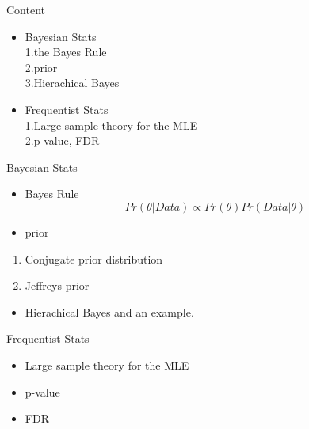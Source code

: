 \documentclass[ignorenonframetext,]{beamer}
\begin{document}
\begin{frame}{Content}

\begin{itemize}
\itemsep1pt\parskip0pt
\item
  Bayesian Stats\\ 1.the Bayes Rule\\ 2.prior\\ 3.Hierachical Bayes\\
\item
  Frequentist Stats\\ 1.Large sample theory for the MLE\\ 2.p-value, FDR
\end{itemize}

\end{frame}

\begin{frame}{Bayesian Stats}

\begin{itemize}
\itemsep1pt\parskip0pt
\item
  Bayes Rule \[Pr(\theta|Data) \varpropto Pr(\theta)Pr(Data|\theta)\]
\item
  prior\\
\end{itemize}

\begin{enumerate}
\def\labelenumi{\arabic{enumi}.}
\itemsep1pt\parskip0pt
\item
  Conjugate prior distribution\\
\item
  Jeffreys prior\\
\end{enumerate}

\begin{itemize}
\itemsep1pt\parskip0pt
\item
  Hierachical Bayes and an example.
\end{itemize}

\end{frame}

\begin{frame}{Frequentist Stats}

\begin{itemize}
\itemsep1pt\parskip0pt
\item
  Large sample theory for the MLE\\
\item
  p-value\\
\item
  FDR
\end{itemize}

\end{frame}
\end{document}
